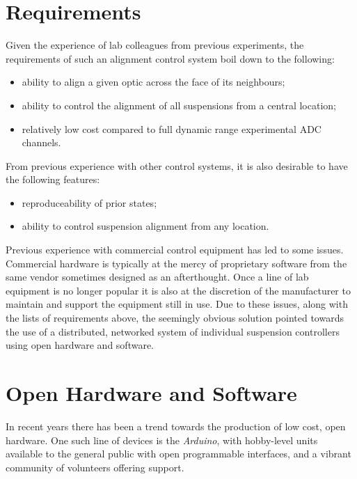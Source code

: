 \section{Requirements}
Given the experience of lab colleagues from previous experiments, the requirements of such an alignment control system boil down to the following:
\begin{itemize}
 \item ability to align a given optic across the face of its neighbours;
 \item ability to control the alignment of all suspensions from a central location;
 \item relatively low cost compared to full dynamic range experimental ADC channels.
\end{itemize}
From previous experience with other control systems, it is also desirable to have the following features:
\begin{itemize}
 \item reproduceability of prior states;
 \item ability to control suspension alignment from any location.
\end{itemize}
Previous experience with commercial control equipment has led to some issues. Commercial hardware is typically at the mercy of proprietary software from the same vendor sometimes designed as an afterthought. Once a line of lab equipment is no longer popular it is also at the discretion of the manufacturer to maintain and support the equipment still in use. Due to these issues, along with the lists of requirements above, the seemingly obvious solution pointed towards the use of a distributed, networked system of individual suspension controllers using open hardware and software.

\section{Open Hardware and Software}
In recent years there has been a trend towards the production of low cost, open hardware. One such line of devices is the \emph{Arduino}, with hobby-level units available to the general public with open programmable interfaces, and a vibrant community of volunteers offering support.